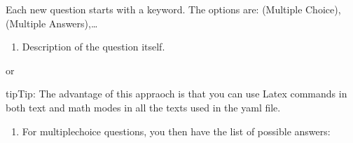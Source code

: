 \documentclass[letterpaper,10pt,english]{sphinxmanual}
\begin{document}
\begin{sphinxVerbatim}[commandchars=\\\{\}]
  
\end{sphinxVerbatim}

Each new question starts with a  keyword. The options are:  (Multiple Choice),  (Multiple Answers),…
\begin{enumerate}
%
\setcounter{enumi}{1}
\item {} 
Description of the question itself.

\end{enumerate}

\begin{sphinxVerbatim}[commandchars=\\\{\}]
  
\end{sphinxVerbatim}

or

\begin{sphinxVerbatim}[commandchars=\\\{\}]
  
\end{sphinxVerbatim}

\begin{sphinxadmonition}{tip}{Tip:}
The advantage of this appraoch is that you can use Latex commands in both text and math modes in all the texts used in the yaml file.
\end{sphinxadmonition}
\begin{enumerate}
%
\setcounter{enumi}{2}
\item {} 
For multiple\sphinxhyphen{}choice questions, you then have the list of possible answers:

\end{enumerate}

\begin{sphinxVerbatim}[commandchars=\\\{\}]
        
        
\end{sphinxVerbatim}
\end{document}
